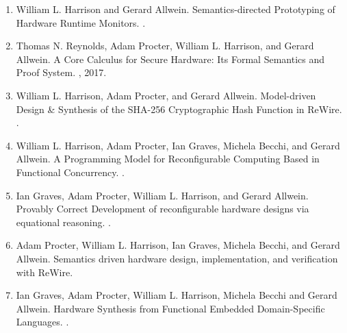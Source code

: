 \documentclass[12pt]{article} %
\begin{document}
\begin{enumerate}[leftmargin=0.0mm]
\item 
William L. Harrison and Gerard Allwein.
\newblock Semantics-directed Prototyping of Hardware Runtime Monitors.
.

\item 
Thomas N. Reynolds, Adam Procter, William L. Harrison, and Gerard Allwein.
\newblock A Core Calculus for Secure Hardware: Its Formal Semantics and Proof System.
, 2017.


\item
William L. Harrison, Adam Procter, and Gerard Allwein.
\newblock Model-driven Design \& Synthesis of the SHA-256 Cryptographic Hash Function in ReWire.
.




\item
William L. Harrison, Adam Procter, Ian Graves, Michela Becchi, and Gerard Allwein. 
\newblock A Programming Model for Reconfigurable Computing Based in Functional Concurrency.
.

\item
Ian Graves, Adam Procter, William L. Harrison, and Gerard Allwein.
\newblock Provably Correct Development of reconfigurable hardware designs via equational reasoning.
.

\item
Adam Procter, William L. Harrison, Ian Graves, Michela Becchi, and Gerard Allwein. 
\newblock Semantics driven hardware design, implementation, and verification with ReWire. 

\item
Ian Graves, Adam Procter, William L. Harrison, Michela Becchi and Gerard Allwein.
\newblock Hardware Synthesis from Functional Embedded Domain-Specific Languages.
.



\end{enumerate}
\end{document}
